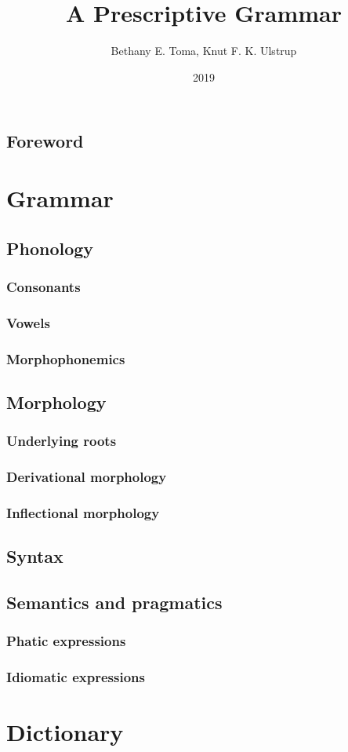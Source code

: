 \documentclass[a4paper,10pt,twoside,openright,draft]{memoir}
\title{{\fontsize{80}{80}\selectfont \lang} \\ \Huge \sffamily A Prescriptive Grammar}
\author{Bethany E. Toma, Knut F. K. Ulstrup}
\date{2019}
\begin{document}
\pagecolor{Melon}
\maketitle
\pagecolor{white}

\frontmatter

\chapter{Foreword}

\tableofcontents

\mainmatter

\part{Grammar}

\chapter{Phonology}
\section{Consonants}
\section{Vowels}
\section{Morphophonemics}

\chapter{Morphology}
\section{Underlying roots}
\section{Derivational morphology}
\section{Inflectional morphology}

\chapter{Syntax}

\chapter{Semantics and pragmatics}
\section{Phatic expressions}
\section{Idiomatic expressions}

\part{Dictionary}
\end{document}
